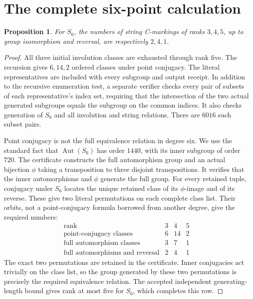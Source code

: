 \documentclass[11pt,a4paper]{article}
\newtheorem{proposition}[lemma]{Proposition}
\begin{document}
\section{The complete six-point calculation}
\begin{proposition}
For $S_6$, the numbers of string C-markings of ranks $3,4,5$, up to group
isomorphism and reversal, are respectively $2,4,1$.
\end{proposition}
\begin{proof}
All three initial involution classes are exhausted through rank five.
The recursion gives $6,14,2$ ordered classes under point conjugacy.
The literal representatives are included with every subgroup and output
receipt. In addition to the recursive enumeration test, a separate verifier
checks every pair of subsets of each representative's index set, requiring
that the intersection of the two actual generated subgroups equals the
subgroup on the common indices. It also checks generation of $S_6$ and
all involution and string relations. There are $6016$ such subset pairs.

Point conjugacy is not the full equivalence relation in degree six.
We use the standard fact that $\operatorname{Aut}(S_6)$ has order $1440$,
with its inner subgroup of order $720$. The certificate constructs the full
automorphism group and an actual bijection $\phi$ taking a transposition to
three disjoint transpositions. It verifies that the inner automorphisms and
$\phi$ generate the full group. For every retained tuple, conjugacy under
$S_6$ locates the unique retained class of its $\phi$-image and of its reverse.
These give two literal permutations on each complete class list. Their
orbits, not a point-conjugacy formula borrowed from another degree, give the
required numbers:
\[
\begin{array}{c|rrr}
\text{rank}&3&4&5\\\hline
\text{point-conjugacy classes}&6&14&2\\
\text{full automorphism classes}&3&7&1\\
\text{full automorphisms and reversal}&2&4&1
\end{array}
\]
The exact two permutations are retained in the certificate. Inner
conjugacies act trivially on the class list, so the group generated by these
two permutations is precisely the required equivalence relation.
The accepted independent generating-length bound gives rank at most five
for $S_6$, which completes this row.
\end{proof}
\end{document}
